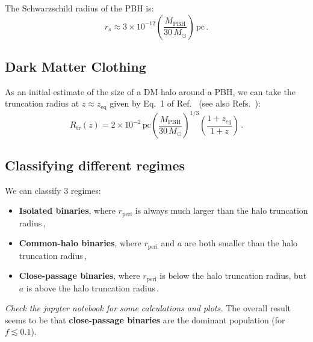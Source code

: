 \documentclass[a4paper,11pt]{article}
\begin{document}
The Schwarzschild radius of the PBH is:
\begin{equation}
r_s \approx 3 \times 10^{-12} \left( \frac{M_{\mathrm{PBH}}}{30 \,M_\odot}\right)\,\mathrm{pc}\,.
\end{equation}

\subsection{Dark Matter Clothing}

As an initial estimate of the size of a DM halo around a PBH, we can take the truncation radius at $z \approx z_\mathrm{eq}$ given by Eq.~1 of Ref.~\cite{Lacki:2010zf} (see also Refs.~\cite{Mack:2006gz,Ricotti:2007jk}):
\begin{equation}
R_\mathrm{tr}(z) = 2 \times 10^{-2} \, \mathrm{pc} \left( \frac{M_{\mathrm{PBH}}}{30 \, M_\odot} \right)^{1/3} \left( \frac{1+z_{eq}}{1+z}\right)\,.
\end{equation}

\subsection{Classifying different regimes}

We can classify 3 regimes:
\begin{itemize}
\item \textbf{Isolated binaries}, where $r_\mathrm{peri}$ is always much larger than the halo truncation radius\,,
\item \textbf{Common-halo binaries}, where $r_\mathrm{peri}$ and $a$ are both smaller than the halo truncation radius\,,
\item \textbf{Close-passage binaries}, where $r_\mathrm{peri}$ is below the halo truncation radius, but $a$ is above the halo truncation radius\,.
\end{itemize}

\textit{Check the jupyter notebook for some calculations and plots.} The overall result seems to be that \textbf{close-passage binaries} are the dominant population (for $f \lesssim 0.1$).



\end{document}
